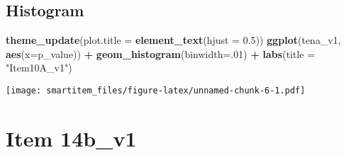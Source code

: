 \documentclass[]{book}
\newenvironment{Shaded}{\begin{snugshade}}{\end{snugshade}}
\newcommand{\KeywordTok}[1]{\textcolor[rgb]{0.13,0.29,0.53}{\textbf{#1}}}
\newcommand{\DataTypeTok}[1]{\textcolor[rgb]{0.13,0.29,0.53}{#1}}
\newcommand{\DecValTok}[1]{\textcolor[rgb]{0.00,0.00,0.81}{#1}}
\newcommand{\FloatTok}[1]{\textcolor[rgb]{0.00,0.00,0.81}{#1}}
\newcommand{\StringTok}[1]{\textcolor[rgb]{0.31,0.60,0.02}{#1}}
\newcommand{\OperatorTok}[1]{\textcolor[rgb]{0.81,0.36,0.00}{\textbf{#1}}}
\newcommand{\NormalTok}[1]{#1}
\theoremstyle{definition}
\theoremstyle{definition}
\theoremstyle{definition}
\theoremstyle{remark}
\begin{document}
\subsection{Histogram}\label{histogram-1}

\begin{Shaded}
\begin{Highlighting}[]
\KeywordTok{theme_update}\NormalTok{(}\DataTypeTok{plot.title =} \KeywordTok{element_text}\NormalTok{(}\DataTypeTok{hjust =} \FloatTok{0.5}\NormalTok{))}
\KeywordTok{ggplot}\NormalTok{(tena_v1, }\KeywordTok{aes}\NormalTok{(}\DataTypeTok{x=}\NormalTok{p_value)) }\OperatorTok{+}\StringTok{ }\KeywordTok{geom_histogram}\NormalTok{(}\DataTypeTok{binwidth=}\NormalTok{.}\DecValTok{01}\NormalTok{) }\OperatorTok{+}\StringTok{ }\KeywordTok{labs}\NormalTok{(}\DataTypeTok{title =} \StringTok{"Item10A_v1"}\NormalTok{) }
\end{Highlighting}
\end{Shaded}

\texttt{[image: smartitem\_files/figure-latex/unnamed-chunk-6-1.pdf]}

\section{Item 14b\_v1}\label{item-14b_v1}

\begin{Shaded}
\end{Shaded}
\end{document}
